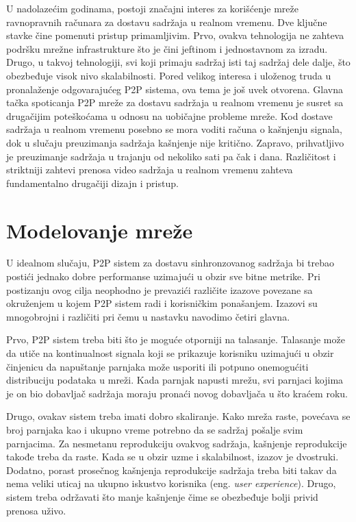 \documentclass[12pt,oneside]{memoir}
\begin{document}
U nadolazećim godinama, postoji značajni interes za korišćenje mreže ravnopravnih računara za dostavu sadržaja u realnom vremenu. Dve ključne stavke čine pomenuti pristup primamljivim. Prvo, ovakva tehnologija ne zahteva podršku mrežne infrastrukture što je čini jeftinom i jednostavnom za izradu. Drugo, u takvoj tehnologiji, svi koji primaju sadržaj isti taj sadržaj dele dalje, što obezbeđuje visok nivo skalabilnosti. Pored velikog interesa i uloženog truda u pronalaženje odgovarajućeg P2P sistema, ova tema je još uvek otvorena. 
Glavna tačka spoticanja P2P mreže za dostavu sadržaja u realnom vremenu je susret sa drugačijim poteškoćama u odnosu na uobičajne probleme mreže. Kod dostave sadržaja u realnom vremenu posebno se mora voditi računa o kašnjenju signala, dok u slučaju preuzimanja sadržaja kašnjenje nije kritično. Zapravo, prihvatljivo je preuzimanje sadržaja u trajanju od nekoliko sati pa čak i dana. Različitost i striktniji zahtevi prenosa video sadržaja u realnom vremenu zahteva fundamentalno drugačiji dizajn i pristup.



\section{Modelovanje mreže}
\label{P2P.5}

U idealnom slučaju, P2P sistem za dostavu sinhronzovanog sadržaja bi trebao postići jednako dobre performanse uzimajući u obzir sve bitne metrike. Pri postizanju ovog cilja neophodno je prevazići različite izazove povezane sa okruženjem u kojem P2P sistem radi i korisničkim ponašanjem. Izazovi su mnogobrojni i različiti pri čemu u nastavku navodimo četiri glavna.

Prvo, P2P sistem treba biti što je moguće otporniji na talasanje. Talasanje može da utiče na kontinualnost signala koji se prikazuje korisniku uzimajući u obzir činjenicu da napuštanje parnjaka može usporiti ili potpuno onemogućiti distribuciju podataka u mreži.
Kada parnjak napusti mrežu, svi parnjaci kojima je on bio dobavljač sadržaja moraju pronaći novog dobavljača u što kraćem roku. 

Drugo, ovakav sistem treba imati dobro skaliranje. Kako mreža raste, povećava se broj parnjaka kao i ukupno vreme potrebno da se sadržaj pošalje svim parnjacima. Za nesmetanu reprodukciju ovakvog sadržaja, kašnjenje reprodukcije takođe treba da raste. Kada se u obzir uzme i skalabilnost, izazov je dvostruki. Dodatno, porast prosečnog kašnjenja reprodukcije sadržaja treba biti takav da nema veliki uticaj na ukupno iskustvo korisnika (eng. \textit{user experience}). Drugo, sistem treba održavati što manje kašnjenje čime se obezbeđuje bolji privid prenosa uživo.
\end{document}
